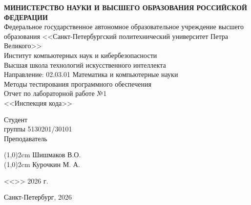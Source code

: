 \documentclass{article}[14pt]
\begin{document}
	
\thispagestyle{empty}
\begin{center}
	\Large {\bfseries МИНИСТЕРСТВО НАУКИ И ВЫСШЕГО ОБРАЗОВАНИЯ РОССИЙСКОЙ ФЕДЕРАЦИИ}
	\\
	\vspace{3mm}
	Федеральное государственное автономное образовательное учреждение высшего образования <<Санкт-Петербургский политехнический университет Петра Великого>>
	\\
	\vspace{3mm}
	Институт компьютерных наук и кибербезопасности
	\\
	\vspace{3mm}
	Высшая школа технологий искусственного интеллекта
	\\
	\vspace{3mm}
	Направление: 02.03.01 Математика и компьютерные науки
	\\
	\vspace{2cm}
	\large{
		Методы тестирования программного обеспечения}
	\\
	\LARGE{
		Отчет по лабораторной работе №1\\
		<<Инспекция кода>>}
\end{center}

\vspace{5.5cm}
\begin{flushleft}
	\Large
	Студент
	\\
	группы 5130201/30101
	\\
	\vspace{2cm}
	\Large
	Преподаватель
	\\ 
\end{flushleft}
\vspace{-4.6cm}
\begin{flushright}
	\Large
	\line(1,0){2cm}
	\hspace{0.4cm}
	Шишмаков В.О.
	\\
	\vspace{2,7cm}
	\hspace{2cm}
	\Large
	\line(1,0){2cm}
	\hspace{0.4cm}
	Курочкин М. А.
	\hspace{-0.1cm}
	
\end{flushright}

\vspace{1cm}
\hspace{9.8cm}
{
	\Large
	\vspace{0.8cm}
	<<\underline{\hspace{1cm}}>>\underline{\hspace{2.5cm}} 2026 г.
}
\hfill \break
\hfill \break
\hfill \break
\hfill \break
\begin{center} \large{Санкт-Петербург, 2026} \end{center}
\pagebreak
\end{document}
